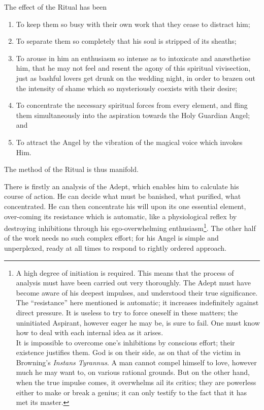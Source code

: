 The effect of the Ritual has been

\begin{enumerate}[label=(\alph*)]
\item To keep them so busy with their own work that they cease to distract him;
\item To separate them so completely that his soul is stripped of its sheaths;
\item To arouse in him an enthusiasm so intense as to intoxicate and an\ae{}sthetise him, that he may not feel and resent the agony of this spiritual vivisection, just as bashful lovers get drunk on the wedding night, in order to brazen out the intensity of shame which so mysteriously coexists with their desire;
\item To concentrate the necessary spiritual forces from every element, and fling them simultaneously into the aspiration towards the Holy Guardian Angel; and
\item To attract the Angel by the vibration of the magical voice which invokes Him.
\end{enumerate}

The method of the Ritual is thus manifold.

There is firstly an analysis of the Adept, which enables him to calculate his course of action. He can decide what must be banished, what purified, what concentrated. He can then concentrate his will upon its one essential element, over-coming its resistance \textemdash{} which is automatic, like a physiological reflex \textemdash{} by destroying inhibitions through his ego-overwhelming enthusiasm\footnote{A high degree of initiation is required. This means that the process of analysis must have been carried out very thoroughly. The Adept must have become aware of his deepest impulses, and understood their true significance. The \enquote{resistance} here mentioned is automatic; it increases indefinitely against direct pressure. It is useless to try to force oneself in these matters; the uninitiated Aspirant, however eager he may be, is sure to fail. One must know how to deal with each internal idea as it arises. \\ It is impossible to overcome one’s inhibitions by conscious effort; their existence justifies them. God is on their side, as on that of the victim in Browning’s \textit{Instans Tyrannus}. A man cannot compel himself to love, however much he may want to, on various rational grounds. But on the other hand, when the true impulse comes, it overwhelms ail its critics; they are powerless either to make or break a genius; it can only testify to the fact that it has met its master.}. The other half of the work needs no such complex effort; for his Angel is simple and unperplexed, ready at all times to respond to rightly ordered approach.

